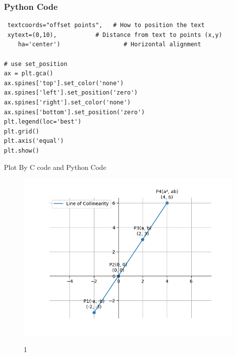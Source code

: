 \documentclass{beamer}
\begin{document}
\begin{frame}[fragile]
\frametitle{Python Code}
\begin{lstlisting}
 textcoords="offset points",   # How to position the text
 xytext=(0,10),           # Distance from text to points (x,y)
    ha='center')                  # Horizontal alignment

# use set_position
ax = plt.gca()
ax.spines['top'].set_color('none')
ax.spines['left'].set_position('zero')
ax.spines['right'].set_color('none')
ax.spines['bottom'].set_position('zero')
plt.legend(loc='best')
plt.grid()
plt.axis('equal')
plt.show()
\end{lstlisting}
\end{frame}
\begin{frame}{Plot By C code and Python Code}
    \begin{figure}
    \centering
    \includegraphics[width=0.7\columnwidth]{figs/Figure_1.png}
    \label{fig:placeholder}
    \caption{1}
\end{figure}
\end{frame}
\end{document}
